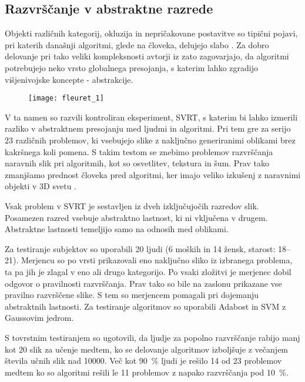 \subsection{Razvrščanje v abstraktne razrede}
Objekti različnih kategorij, okluzija in nepričakovane postavitve so tipični pojavi, pri katerih današnji algoritmi, glede na človeka, delujejo slabo \cite{fleuret2011comparing}. Za dobro delovanje pri tako veliki kompleksnosti avtorji iz \cite{fleuret2011comparing} zato zagovarjajo, da algoritmi potrebujejo neko vrsto globalnega presojanja, s katerim lahko zgradijo višjenivojske koncepte - abstrakcije. 

\begin{figure}[!htbp]
	\centering
	\texttt{[image: fleuret\_1]}
	\caption{}
\end{figure}

V ta namen so razvili kontroliran eksperiment, SVRT, s katerim bi lahko izmerili razliko v abstraktnem presojanju med ljudmi in algoritmi. Pri tem gre za serijo $23$ različnih problemov, ki vsebujejo slike z naključno generiranimi oblikami brez kakršnega koli pomena. S takim testom se znebimo problemov razvrščanja naravnih slik pri algoritmih, kot so osvetlitev, tekstura in šum. Prav tako zmanjšamo prednost človeka pred algoritmi, ker imajo veliko izkušenj z naravnimi objekti v 3D svetu \cite{fleuret2011comparing}. 

Vsak problem v SVRT je sestavljen iz dveh izključujočih razredov slik. Posamezen razred vsebuje abstraktno lastnost, ki ni vključena v drugem. Abstraktne lastnosti temeljijo samo na odnosih med oblikami.

Za testiranje subjektov so uporabili 20 ljudi (6 moških in 14 žensk, starost: 18--21). Merjencu so po vrsti prikazovali eno naključno sliko iz izbranega problema, ta pa jih je zlagal v eno ali drugo kategorijo. Po vsaki zložitvi je merjenec dobil odgovor o pravilnosti razvrščanja. Prav tako so bile na zaslonu prikazane vse pravilno razvrščene slike. S tem so merjencem pomagali pri dojemanju abstraktnih lastnosti. Za testiranje algoritmov so uporabili Adabost in SVM z Gaussovim jedrom.

S tovrstnim testiranjem so ugotovili, da ljudje za popolno razvrščanje rabijo manj kot $20$ slik za učenje medtem, ko se delovanje algoritmov izboljšuje z večanjem števila učnih slik nad \num{10000}. Več kot \SI{90}{\%} ljudi je rešilo 14 od 23 problemov medtem ko so algoritmi rešili le 11 problemov z napako razvrščanja pod \SI{10}{\%}.


